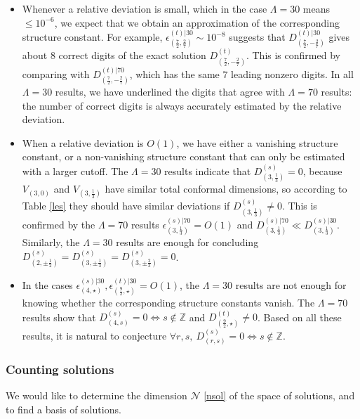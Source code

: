 \documentclass[12pt, a4paper]{article}
\theoremstyle{break}
\begin{document}
\begin{itemize}
 \item
 Whenever a relative deviation is small, which in the case $\Lambda=30$ means $\leq 10^{-6}$, we expect that we obtain an approximation of the corresponding structure constant. For example, $\epsilon_{(\frac72,\frac27)}^{(t)|30}\sim 10^{-8}$ suggests that $D_{(\frac72,-\frac27)}^{(t)|30}$ gives about $8$ correct digits of the exact solution $D_{(\frac72,-\frac27)}^{(t)}$. This is confirmed by comparing with $D_{(\frac72,-\frac27)}^{(t)|70}$, which has the same $7$ leading nonzero digits. In all $\Lambda = 30$ results, we have underlined the digits that agree with $\Lambda = 70$ results: the number of correct digits is always accurately estimated by the relative deviation. 
 \item
 When a relative deviation is $O(1)$, we have either a vanishing structure constant, or a non-vanishing structure constant that can only be estimated with a larger cutoff. The $\Lambda =30$ results
 indicate that $D^{(s)}_{(3,\frac13)}=0$, because $V_{(3,0)}$ and $V_{(3,\frac13)}$ have similar total conformal dimensions, so according to Table \eqref{les} they should have similar deviations if $D^{(s)}_{(3,\frac13)}\neq 0$. This is confirmed by the $\Lambda = 70$ results $\epsilon_{(3,\frac13)}^{(s)|70} = O(1)$ and $D_{(3,\frac13)}^{(s)|70} \ll D_{(3,\frac13)}^{(s)|30}$.
 Similarly, the $\Lambda = 30$ results are enough for concluding $D^{(s)}_{(2,\pm\frac12)} =D^{(s)}_{(3,\pm \frac13)} = D^{(s)}_{(3,\pm \frac23)}=0$.
 \item
 In the cases $\epsilon^{(s)|30}_{(4,\star )},\epsilon^{(t)|30}_{(\frac92,\star)} = O(1)$, the $\Lambda =30$ results are not enough for knowing whether the corresponding structure constants vanish. The $\Lambda =70$ results show that $D^{(s)}_{(4,s)} = 0 \iff s \notin \mathbb{Z}$ and $D^{(t)}_{(\frac92,\star)} \neq 0$. Based on all these results, it is natural to conjecture $\forall r,s,\ D^{(s)}_{(r,s)} = 0 \iff s \notin \mathbb{Z}$.
\end{itemize}


\subsubsection{Counting solutions}

We would like to determine the dimension $\mathcal{N}$ \eqref{nsol} of the space of solutions, and to find a basis of solutions. 
\end{document}
